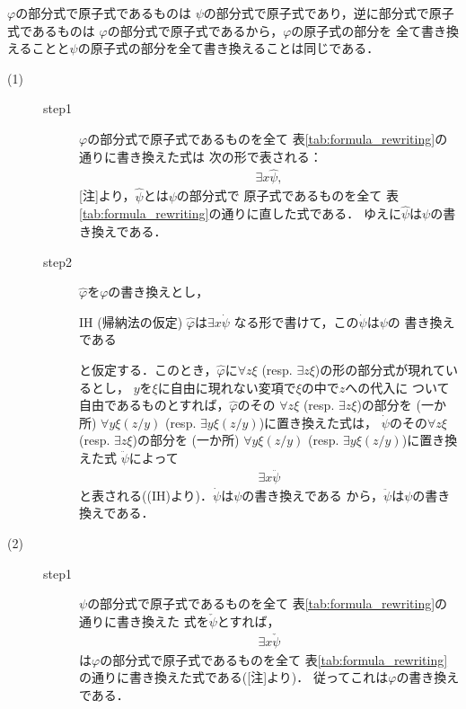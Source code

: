 	\begin{metaprf}
		[注] $\varphi$の部分式で原子式であるものは
		$\psi$の部分式で原子式であり，逆に部分式で原子式であるものは
		$\varphi$の部分式で原子式であるから，$\varphi$の原子式の部分を
		全て書き換えることと$\psi$の原子式の部分を全て書き換えることは同じである．
		\begin{description}
			\item[(1)] 
				\begin{description}
					\item[step1]
						$\varphi$の部分式で原子式であるものを全て
						表\ref{tab:formula_rewriting}の通りに書き換えた式は
						次の形で表される：
						\begin{align}
							\exists x \hat{\psi},
						\end{align}
						[注]より，$\hat{\psi}$とは$\psi$の部分式で
						原子式であるものを全て
						表\ref{tab:formula_rewriting}の通りに直した式である．
						ゆえに$\hat{\psi}$は$\psi$の書き換えである．
						
					\item[step2]
						$\widehat{\varphi}$を$\varphi$の書き換えとし，
						\begin{itembox}[l]{IH (帰納法の仮定)}
							$\widehat{\varphi}$は$\exists x \dot{\psi}$
							なる形で書けて，この$\dot{\psi}$は$\psi$の
							書き換えである
						\end{itembox}
						と仮定する．このとき，$\widehat{\varphi}$に$\forall z \xi$ 
						(resp. $\exists z \xi$)の形の部分式が現れているとし，
						$y$を$\xi$に自由に現れない変項で$\xi$の中で$z$への代入に
						ついて自由であるものとすれば，$\widehat{\varphi}$のその
						$\forall z \xi$ (resp. $\exists z \xi$)の部分を
						(一か所) $\forall y \xi(z/y)$
						(resp. $\exists y \xi(z/y)$)に置き換えた式は，
						$\dot{\psi}$のその$\forall z \xi$
						(resp. $\exists z \xi$)の部分を
						(一か所) $\forall y \xi(z/y)$
						(resp. $\exists y \xi(z/y)$)に置き換えた式
						$\ddot{\psi}$によって
						\begin{align}
							\exists x \ddot{\psi}
						\end{align}
						と表される((IH)より)．$\dot{\psi}$は$\psi$の書き換えである
						から，$\ddot{\psi}$は$\psi$の書き換えである．
				\end{description}
				
			\item[(2)]		
				\begin{description}
					\item[step1]
						$\psi$の部分式で原子式であるものを全て
						表\ref{tab:formula_rewriting}の通りに書き換えた
						式を$\check{\psi}$とすれば，
						\begin{align}
							\exists x \check{\psi}
						\end{align}
						は$\varphi$の部分式で原子式であるものを全て
						表\ref{tab:formula_rewriting}の通りに書き換えた式である([注]より)．
						従ってこれは$\varphi$の書き換えである．
								

\end{description}
\end{description}
\end{metaprf}
